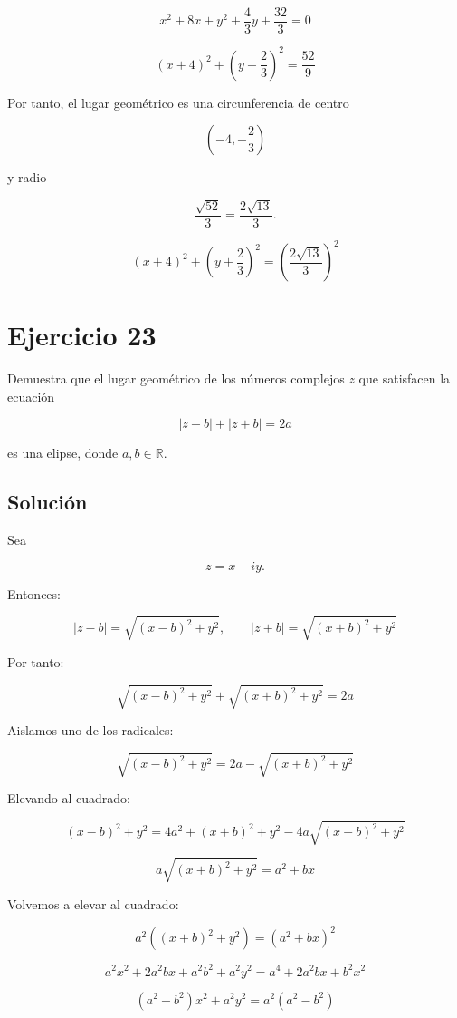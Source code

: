 \documentclass[fleqn]{article}
\begin{document}
		\[
		x^2+8x+y^2+\frac{4}{3}y+\frac{32}{3}=0
		\]

		\[
		(x+4)^2+\left(y+\frac{2}{3}\right)^2
		=
		\frac{52}{9}
		\]

		Por tanto, el lugar geométrico es una circunferencia de centro

		\[
		\left(-4,-\frac{2}{3}\right)
		\]

		y radio

		\[
		\frac{\sqrt{52}}{3}
		=
		\frac{2\sqrt{13}}{3}.
		\]

		\[
		\boxed{
		\left(x+4\right)^2+
		\left(y+\frac{2}{3}\right)^2
		=
		\left(\frac{2\sqrt{13}}{3}\right)^2
		}
		\]
	
	\section{Ejercicio 23}
		Demuestra que el lugar geométrico de los números complejos $z$ que satisfacen la ecuación

		\[
		|z-b|+|z+b|=2a
		\]

		es una elipse, donde $a,b\in\mathbb{R}$.

		\subsection{Solución}

		Sea

		\[
		z=x+iy.
		\]

		Entonces:

		\[
		|z-b|
		=
		\sqrt{(x-b)^2+y^2},
		\qquad
		|z+b|
		=
		\sqrt{(x+b)^2+y^2}
		\]

		Por tanto:

		\[
		\sqrt{(x-b)^2+y^2}
		+
		\sqrt{(x+b)^2+y^2}
		=
		2a
		\]

		Aislamos uno de los radicales:

		\[
		\sqrt{(x-b)^2+y^2}
		=
		2a-\sqrt{(x+b)^2+y^2}
		\]

		Elevando al cuadrado:

		\[
		(x-b)^2+y^2
		=
		4a^2+(x+b)^2+y^2
		-
		4a\sqrt{(x+b)^2+y^2}
		\]

		\[
		a\sqrt{(x+b)^2+y^2}
		=
		a^2+bx
		\]

		Volvemos a elevar al cuadrado:

		\[
		a^2\left((x+b)^2+y^2\right)
		=
	(a^2+bx)^2
		\]

		\[
		a^2x^2+2a^2bx+a^2b^2+a^2y^2
		=
		a^4+2a^2bx+b^2x^2
		\]

		\[
		(a^2-b^2)x^2+a^2y^2
		=
		a^2(a^2-b^2)
		\]
\end{document}
